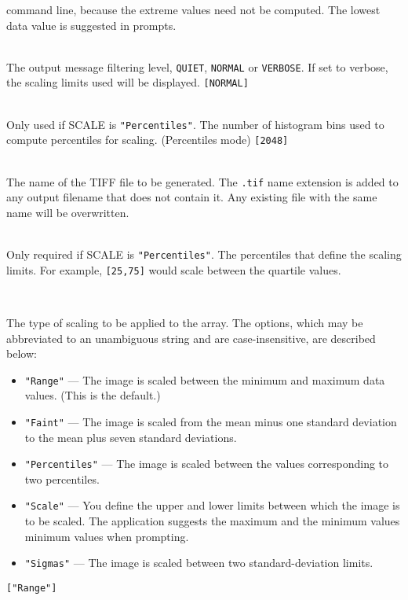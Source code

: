 \documentclass[twoside,11pt]{article}
\newcommand{\xref}[3]{#1}
\newcommand{\sstsubsection}[1]{ \item[{#1}] \mbox{} \\}
\newcommand{\ssthitemlist}[1]{
  \latexonly{
  \mbox{} \\
  \vspace{-3.5ex}
  }
  \begin{itemize}
     #1
  \end{itemize}
}
\newcommand{\sstitem}{\item}
\newcommand{\sstsubsection}[1]{\item[{#1}]}
\newcommand{\sstitem}{\item}
\begin{document}
{{{        command line, because the extreme values need not be computed.
        The lowest data value is suggested in prompts.
      }
      \sstsubsection{
        MSG\_FILTER = LITERAL (Read)
      }{
        The output message filtering level, \texttt{QUIET}, \texttt{NORMAL} or
        \texttt{VERBOSE}. If set to verbose, the scaling limits used will be
        displayed. \texttt{[NORMAL]}
      } 
      \sstsubsection{
        NUMBIN  =  \_INTEGER (Read)
      }{
        Only used if SCALE is {\texttt{"Percentiles"}}.
        The number of histogram bins used to compute percentiles for
        scaling. (Percentiles mode) \texttt{[2048]}
      }
      \sstsubsection{
         OUT = \_CHAR (Read)
      }{
         The name of the TIFF file to be generated.
         The \texttt{.tif} name extension is added to any output filename that
         does not contain it.     
         Any existing file with the same name will be overwritten.
      }
      \sstsubsection{
        PERCENTILES( 2 ) = \_REAL (Read)
      }{
        Only required if SCALE is {\texttt{"Percentiles"}}.
        The percentiles that define the scaling limits. For example,
        {\texttt{[25,75]}} would scale between the quartile values.
      }
      \sstsubsection{
         SCALE =  \xref{LITERAL}{sun95}{se_parmenu} (Read)
      }{
        The type of scaling to be applied to the array.
        The options, which may be abbreviated to an unambiguous string
        and are case-insensitive, are described below:
        \ssthitemlist{
           \sstitem
           {\texttt{"Range"}}  --- The image is scaled between the minimum and
                          maximum data values. (This is the default.)
           \sstitem
           {\texttt{"Faint"}}  --- The image is scaled from the mean minus one
                          standard deviation to the mean plus seven
                          standard deviations.  
           \sstitem
           {\texttt{"Percentiles"}} --- The image is scaled between the values
                          corresponding to two percentiles.  
           \sstitem
           {\texttt{"Scale"}} --- You define the upper and lower limits
                          between which the image is to be scaled.  The
                          application suggests the maximum and the
                          minimum values minimum values when prompting.
           \sstitem
           {\texttt{"Sigmas"}} --- The image is scaled between two
                          standard-deviation limits.  
         }
         \texttt{["Range"]}
      }
      \sstsubsection{
        SIGMAS( 2 ) = \_REAL (Read)
}}}
\end{document}

